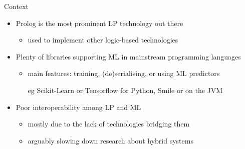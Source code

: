 \documentclass[presentation]{beamer}\mode<presentation>{\usetheme{AMSBolognaFC}}
\begin{document}
\begin{frame}[c]{Context}
    
    \begin{itemize}
        \item Prolog is the most prominent LP technology out there
        \begin{itemize}
            \item used to implement other logic-based technologies 
        \end{itemize}
        
        \vfill
        
        \item Plenty of libraries supporting ML in mainstream programming languages
        \begin{itemize}
            \item main features: training, (de)serialising, or using ML predictors
            \item[eg] Scikit-Learn or Tensorflow for Python, Smile or \deeplearningforj{} on the JVM
        \end{itemize}
        
        \vfill
        
        \item Poor interoperability among LP and ML
        \begin{itemize}
            \item mostly due to the lack of technologies bridging them
            \item arguably slowing down research about hybrid systems
        \end{itemize}
    \end{itemize}
\end{frame}
\end{document}
